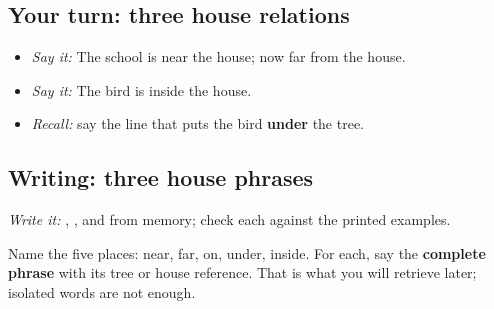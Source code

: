 \subsection*{Your turn: three house relations}
\begin{itemize}
\raggedright
  \item \emph{Say it:} The school is near the house; now far from the house.
  \item \emph{Say it:} The bird is inside the house.
  \item \emph{Recall:} say the line that puts the bird \textbf{under} the tree.
\end{itemize}

\subsection*{Writing: three house phrases}
\emph{Write it:} \textbf{ }, \textbf{ }, and \textbf{} from memory; check each against the printed examples.

\begin{tcolorbox}[breakable,colback=teal!4,colframe=teal!35!black,title={Before you move on}]
Name the five places: near, far, on, under, inside. For each, say the \textbf{complete phrase} with its tree or house reference. That is what you will retrieve later; isolated words are not enough.
\end{tcolorbox}
